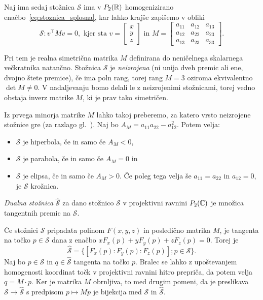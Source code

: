 Naj ima sedaj stožnica $\mathcal{S}$ ima v $P_2(\mathbb R)$ homogenizirano enačbo~\ref{eq:stoznica_splosna}, kar lahko krajše zapišemo v obliki
\begin{equation}
    \label{eq:stoznica_matricna}
    \mathcal{S}: v^\intercal M v = 0,
    \text{ kjer sta } v =
    \begin{bmatrix}
        x\\
        y\\
        z
    \end{bmatrix}
    \text{ in } M =
    \begin{bmatrix}
        a_{11} & a_{12} & a_{13}\\
        a_{12} & a_{22} & a_{23}\\
        a_{13} & a_{23} & a_{33}
    \end{bmatrix}.
\end{equation}

Pri tem je realna simetrična matrika $M$ definirana do neničelnega skalarnega večkratnika natančno. Stožnica $\mathcal{S}$ je \emph{neizrojena} (ni unija dveh premic ali ene, dvojno štete premice), če ima poln rang, torej rang $ M = 3$ oziroma ekvivalentno $\det M \neq 0$. V nadaljevanju bomo delali le z neizrojenimi stožnicami, torej vedno obstaja inverz matrike $M$, ki je prav tako simetričen.

Iz prvega minorja matrike $M$ lahko takoj preberemo, za katero vrsto neizrojene stožnice gre (za razlago gl.\ \cite{sivic2020}). Naj bo $A_M = a_{11}a_{22} - a_{12}^2$. Potem velja:
\begin{itemize}
    \item $\mathcal{S}$ je hiperbola, če in samo če $A_M < 0$,
    \item $\mathcal{S}$ je parabola, če in samo če $A_M = 0$ in
    \item $\mathcal{S}$ je elipsa, če in samo če $A_M > 0$. Če poleg tega velja še $a_{11} = a_{22}$ in $a_{12} = 0$, je $\mathcal{S}$ krožnica.
\end{itemize}

\begin{definicija}
    \emph{Dualna stožnica} $\mathcal{\hat{S}}$ za dano stožnico $\mathcal{S}$ v projektivni ravnini $P_2(\mathbb C)$ je množica tangentnih premic na $\mathcal{S}$.
\end{definicija}

Če stožnici $\mathcal{S}$ pripadata polinom $F(x,y,z)$ in posledično matrika $M$, je tangenta na točko $p \in \mathcal{S}$ dana z enačbo $x F_x(p) + y F_y(p) + z F_z(p) = 0$. Torej je
$$ \mathcal{\hat{S}} = \{[F_x(p) : F_y(p) : F_z(p)]; p \in \mathcal{S} \}.$$
Naj bo $p \in \mathcal{S}$ in $ q \in \mathcal{\hat{S}}$ tangenta na točko $p$. Bralec se lahko z upoštevanjem homogenosti koordinat točk v projektivni ravnini hitro prepriča, da potem velja $q = M \cdot p$. Ker je matrika $M$ obrnljiva, to med drugim pomeni, da je preslikava $\mathcal{S} \longrightarrow \mathcal{\hat{S}}$ s predpisom $p \mapsto Mp$ je bijekcija med $\mathcal{S}$ in $\mathcal{\hat{S}}$.

